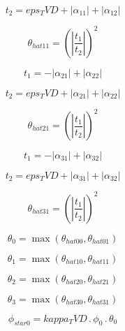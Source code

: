 \documentclass{article}
\begin{document}
\begin{dmath}t_{2} = eps_TVD + \left|{\alpha_{11}}\right| + \left|{\alpha_{12}}\right|\end{dmath}

\begin{dmath}\theta_{hat 11} = \left(\left|{\frac{t_{1}}{t_{2}}}\right| \right)^{2}\end{dmath}

\begin{dmath}t_{1} = - \left|{\alpha_{21}}\right| + \left|{\alpha_{22}}\right|\end{dmath}

\begin{dmath}t_{2} = eps_TVD + \left|{\alpha_{21}}\right| + \left|{\alpha_{22}}\right|\end{dmath}

\begin{dmath}\theta_{hat 21} = \left(\left|{\frac{t_{1}}{t_{2}}}\right| \right)^{2}\end{dmath}

\begin{dmath}t_{1} = - \left|{\alpha_{31}}\right| + \left|{\alpha_{32}}\right|\end{dmath}

\begin{dmath}t_{2} = eps_TVD + \left|{\alpha_{31}}\right| + \left|{\alpha_{32}}\right|\end{dmath}

\begin{dmath}\theta_{hat 31} = \left(\left|{\frac{t_{1}}{t_{2}}}\right| \right)^{2}\end{dmath}

\begin{dmath}\theta_{0} = \max\left(\theta_{hat 00}, \theta_{hat 01}\right)\end{dmath}

\begin{dmath}\theta_{1} = \max\left(\theta_{hat 10}, \theta_{hat 11}\right)\end{dmath}

\begin{dmath}\theta_{2} = \max\left(\theta_{hat 20}, \theta_{hat 21}\right)\end{dmath}

\begin{dmath}\theta_{3} = \max\left(\theta_{hat 30}, \theta_{hat 31}\right)\end{dmath}

\begin{dmath}\phi_{star 0} = kappa_TVD \,.\, \phi_{0} \,.\, \theta_{0}\end{dmath}
\end{document}
